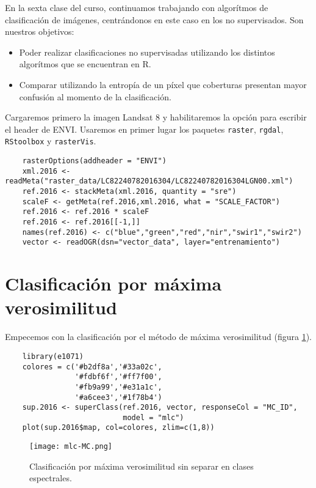 En la sexta clase del curso, continuamos trabajando con algor\'itmos de clasificaci\'on de im\'agenes, centr\'andonos en este caso en los no supervisados. Son nuestros objetivos:

\begin{itemize}
  \item Poder realizar clasificaciones no supervisadas utilizando los distintos algor\'itmos que se encuentran en R.
  \item Comparar utilizando la entrop\'ia de un p\'ixel que coberturas presentan  mayor confusi\'on al momento de la clasificaci\'on.
\end{itemize}

Cargaremos primero la imagen Landsat 8 y habilitaremos la opci\'on para escribir el header de ENVI\@. Usaremos en primer lugar los paquetes \texttt{raster}, \texttt{rgdal}, \texttt{RStoolbox} y \texttt{rasterVis}.

\begin{lstlisting}
    rasterOptions(addheader = "ENVI")
    xml.2016 <- readMeta("raster_data/LC82240782016304/LC82240782016304LGN00.xml")
    ref.2016 <- stackMeta(xml.2016, quantity = "sre")
    scaleF <- getMeta(ref.2016,xml.2016, what = "SCALE_FACTOR")
    ref.2016 <- ref.2016 * scaleF
    ref.2016 <- ref.2016[[-1,]]
    names(ref.2016) <- c("blue","green","red","nir","swir1","swir2")
    vector <- readOGR(dsn="vector_data", layer="entrenamiento")
\end{lstlisting}

\section{Clasificaci\'on por m\'axima verosimilitud}

Empecemos con la clasificaci\'on por el m\'etodo de m\'axima verosimilitud (figura \ref{fig:MC}).

\begin{lstlisting}
    library(e1071)
    colores = c('#b2df8a','#33a02c',
                '#fdbf6f','#ff7f00',
                '#fb9a99','#e31a1c',
                '#a6cee3','#1f78b4')
    sup.2016 <- superClass(ref.2016, vector, responseCol = "MC_ID",
                           model = "mlc")
    plot(sup.2016$map, col=colores, zlim=c(1,8))
\end{lstlisting}

\begin{figure}[h!]
  \centering
  \texttt{[image: mlc-MC.png]}
  \caption{Clasificaci\'on por m\'axima verosimilitud sin separar en clases espectrales.}
  \label{fig:MC}
\end{figure}

